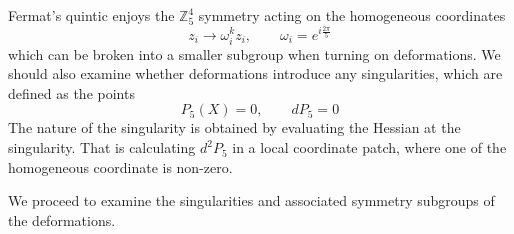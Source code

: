 Fermat's quintic enjoys the $\mathbb Z_5^4$ symmetry acting on the homogeneous coordinates 
\begin{equation}
  z_i \to \omega^k_i z_i, \qquad \omega_i=e^{i\frac{2\pi}{5}}
\end{equation}
which can be broken into a smaller subgroup when turning on deformations.
We should also examine whether deformations introduce any singularities, which
are defined as the points 
\begin{equation}
  P_5(X)=0, \qquad dP_5=0
\end{equation}
The nature of the singularity is obtained by evaluating the Hessian at the singularity.
That is calculating $d^2 P_5$ in a local coordinate patch, where one of the homogeneous coordinate is non-zero.

We proceed to examine the singularities and associated symmetry subgroups of the deformations.
